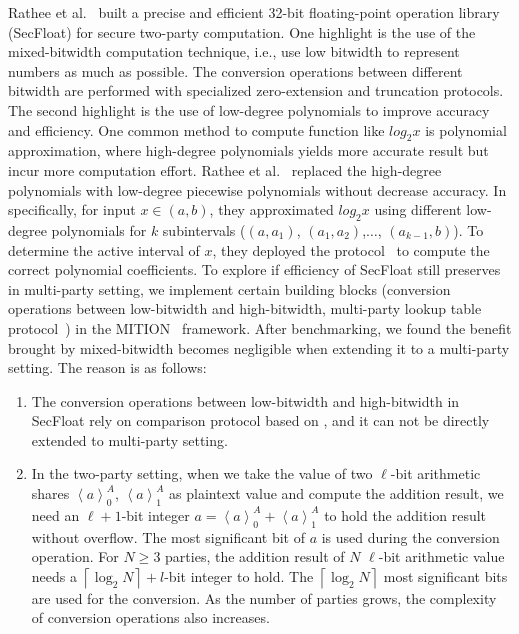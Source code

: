 Rathee et al.~\cite{rathee2022secfloat} built a precise and efficient 32-bit floating-point operation library (SecFloat) for secure two-party computation. One highlight is the use of the mixed-bitwidth computation technique, i.e., use low bitwidth to represent numbers as much as possible. The conversion operations between different bitwidth are performed with specialized zero-extension and truncation \twopc protocols.
The second highlight is the use of low-degree polynomials to improve accuracy and efficiency.
One common method to compute function like $log_{2}x$ is polynomial approximation, where high-degree polynomials yields more accurate result but incur more computation effort. Rathee et al.~\cite{rathee2022secfloat} replaced the high-degree polynomials with low-degree piecewise polynomials without decrease accuracy. In specifically, for input $x\in \left(a,b\right) $, they approximated $log_2 x$ using different low-degree polynomials for $k$ subintervals ($\left(a, a_1\right) $, $\left(a_1, a_2\right)  $,$\ldots$, $\left(a_{k-1}, b\right) $). To determine the active interval of $x$, they deployed the \lut protocol~\cite{dessouky2017pushing} to compute the correct polynomial coefficients.
To explore if efficiency of SecFloat still preserves in multi-party setting, we implement certain building blocks (conversion operations between low-bitwidth and high-bitwidth, multi-party lookup table protocol~\cite{keller2017faster}) in the MITION~\cite{braun2022motion} framework. After benchmarking, we found the benefit brought by mixed-bitwidth becomes negligible when extending it to a multi-party setting. The reason is as follows:
\begin{enumerate}
    \item The conversion operations between low-bitwidth and high-bitwidth in SecFloat rely on \twopc comparison protocol based on \ot, and it can not be directly extended to multi-party setting.
    \item In the two-party setting, when we take the value of two $\ell$-bit arithmetic shares $\left\langle a\right\rangle^A_0 $, $\left\langle a\right\rangle^A_1$ as plaintext value and compute the addition result, we need an $\ell+1$-bit integer $a =\left\langle a\right\rangle^A_0 +\left\langle a\right\rangle^A_1 $ to hold the addition result without overflow. The most significant bit of $a$ is used during the conversion operation. For $N\geq 3$ parties, the addition result of $N$ $\ell$-bit arithmetic value needs a $\left\lceil \log_2{N}\right\rceil +l$-bit integer to hold. The $\left\lceil \log_2{N}\right\rceil$ most significant bits are used for the conversion. As the number of parties grows, the complexity of conversion operations also increases.
\end{enumerate}

